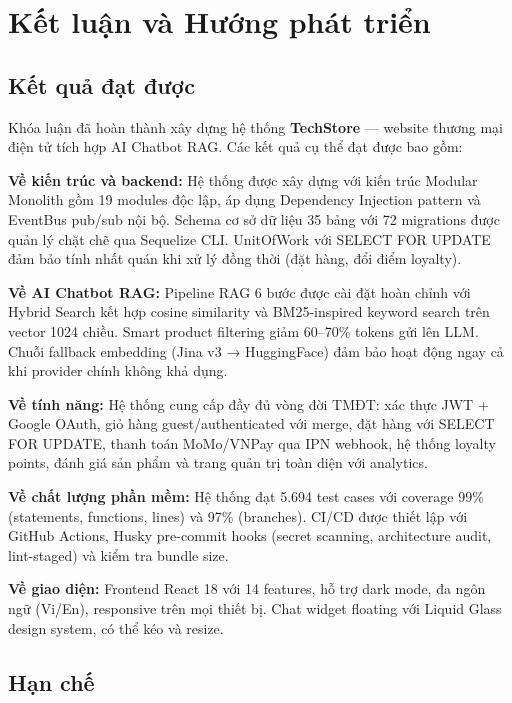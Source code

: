 \chapter*{Kết luận và Hướng phát triển}

\section*{Kết quả đạt được}

Khóa luận đã hoàn thành xây dựng hệ thống \textbf{TechStore} --- website thương mại điện tử tích hợp AI Chatbot RAG. Các kết quả cụ thể đạt được bao gồm:

\textbf{Về kiến trúc và backend:} Hệ thống được xây dựng với kiến trúc Modular Monolith gồm 19 modules độc lập, áp dụng Dependency Injection pattern và EventBus pub/sub nội bộ. Schema cơ sở dữ liệu 35 bảng với 72 migrations được quản lý chặt chẽ qua Sequelize CLI. UnitOfWork với SELECT FOR UPDATE đảm bảo tính nhất quán khi xử lý đồng thời (đặt hàng, đổi điểm loyalty).

\textbf{Về AI Chatbot RAG:} Pipeline RAG 6 bước được cài đặt hoàn chỉnh với Hybrid Search kết hợp cosine similarity và BM25-inspired keyword search trên vector 1024 chiều. Smart product filtering giảm 60--70\% tokens gửi lên LLM. Chuỗi fallback embedding (Jina v3 → HuggingFace) đảm bảo hoạt động ngay cả khi provider chính không khả dụng.

\textbf{Về tính năng:} Hệ thống cung cấp đầy đủ vòng đời TMĐT: xác thực JWT + Google OAuth, giỏ hàng guest/authenticated với merge, đặt hàng với SELECT FOR UPDATE, thanh toán MoMo/VNPay qua IPN webhook, hệ thống loyalty points, đánh giá sản phẩm và trang quản trị toàn diện với analytics.

\textbf{Về chất lượng phần mềm:} Hệ thống đạt 5.694 test cases với coverage 99\% (statements, functions, lines) và 97\% (branches). CI/CD được thiết lập với GitHub Actions, Husky pre-commit hooks (secret scanning, architecture audit, lint-staged) và kiểm tra bundle size.

\textbf{Về giao diện:} Frontend React 18 với 14 features, hỗ trợ dark mode, đa ngôn ngữ (Vi/En), responsive trên mọi thiết bị. Chat widget floating với Liquid Glass design system, có thể kéo và resize.

\section*{Hạn chế}


